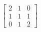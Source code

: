 \begin{displaymath}
 \begin{bmatrix}
  2 & 1 & 0 \\
  1 & 1 & 1 \\
  0 & 1 & 2 
 \end{bmatrix}
\end{displaymath}
